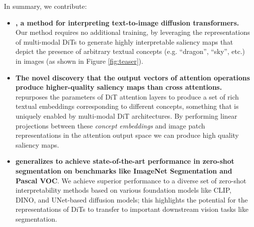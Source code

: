 In summary, we contribute:

\begin{itemize}
    \item \textbf{\tool{}, a method for interpreting text-to-image diffusion transformers.} Our method requires no additional training, by leveraging the representations of multi-modal DiTs to generate highly interpretable saliency maps that depict the presence of arbitrary textual concepts (e.g. ``dragon'', ``sky'', etc.) in images (as shown in Figure \ref{fig:teaser}). 
    
    \item \textbf{The novel discovery that the output vectors of attention operations produce higher-quality saliency maps than cross attentions.} \tool{} repurposes the parameters of DiT attention layers to produce a set of rich textual embeddings corresponding to different concepts, something that is uniquely enabled by multi-modal DiT architectures. By performing linear projections between these \textit{concept embeddings} and image patch representations in the attention output space we can produce high quality saliency maps. 
    \item  \textbf{\tool{} generalizes to achieve state-of-the-art performance in zero-shot segmentation on benchmarks like ImageNet Segmentation and Pascal VOC}. We achieve superior performance to a diverse set of zero-shot interpretability methods based on various foundation models like CLIP, DINO, and UNet-based diffusion models; this highlights the potential for the representations of DiTs to transfer to important downstream vision tasks like segmentation. 
    

\end{itemize}
